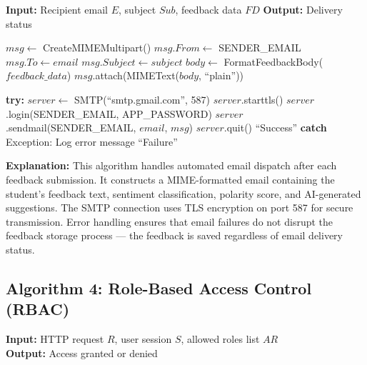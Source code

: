 \begin{algorithm}[H]
\caption{SMTP Email Notification Dispatch}
\begin{algorithmic}[1]

\State \textbf{Input:} Recipient email $E$, subject $Sub$, feedback data $FD$
\State \textbf{Output:} Delivery status

    \State $msg \gets$ CreateMIMEMultipart()
    \State $msg.From \gets$ SENDER\_EMAIL
    \State $msg.To \gets email$
    \State $msg.Subject \gets subject$
    \State $body \gets$ FormatFeedbackBody($feedback\_data$)
    \State $msg$.attach(MIMEText($body$, ``plain''))
    
    \State \textbf{try:}
    \State \hspace{1em} $server \gets$ SMTP(``smtp.gmail.com'', 587)
    \State \hspace{1em} $server$.starttls() 
    \State \hspace{1em} $server$.login(SENDER\_EMAIL, APP\_PASSWORD)
    \State \hspace{1em} $server$.sendmail(SENDER\_EMAIL, $email$, $msg$)
    \State \hspace{1em} $server$.quit()
    \State \hspace{1em} \Return ``Success''
    \State \textbf{catch} Exception:
    \State \hspace{1em} Log error message
    \State \hspace{1em} \Return ``Failure''
\EndFunction

\end{algorithmic}
\end{algorithm}

\textbf{Explanation:}
This algorithm handles automated email dispatch after each feedback submission. It constructs a MIME-formatted email containing the student's feedback text, sentiment classification, polarity score, and AI-generated suggestions. The SMTP connection uses TLS encryption on port 587 for secure transmission. Error handling ensures that email failures do not disrupt the feedback storage process — the feedback is saved regardless of email delivery status.


\subsection{Algorithm 4: Role-Based Access Control (RBAC)}

\textbf{Input:} HTTP request $R$, user session $S$, allowed roles list $AR$ \\
\textbf{Output:} Access granted or denied

